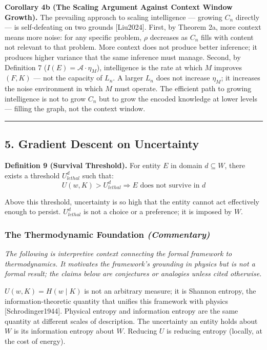 \documentclass[
]{article}
\begin{document}
\textbf{Corollary 4b (The Scaling Argument Against Context Window
Growth).} The prevailing approach to scaling intelligence --- growing
\(C_n\) directly --- is self-defeating on two grounds {[}Liu2024{]}.
First, by Theorem 2a, more context means more noise: for any specific
problem, \(\rho\) decreases as \(C_n\) fills with content not relevant
to that problem. More context does not produce better inference; it
produces higher variance that the same inference must manage. Second, by
Definition 7 (\(I(E) = \mathcal{A} \cdot
\eta_M\)), intelligence is the rate at which \(M\) improves \((F, K)\)
--- not the capacity of \(L_n\). A larger \(L_n\) does not increase
\(\eta_M\); it increases the noise environment in which \(M\) must
operate. The efficient path to growing intelligence is not to grow
\(C_n\) but to grow the encoded knowledge at lower levels --- filling
the graph, not the context window.

\begin{center}\rule{0.5\linewidth}{0.5pt}\end{center}

\subsection{5. Gradient Descent on
Uncertainty}\label{gradient-descent-on-uncertainty}

\textbf{Definition 9 (Survival Threshold).} For entity \(E\) in domain
\(d \subseteq W\), there exists a threshold \(U_{lethal}^d\) such that:
\[U(w, K) > U_{lethal}^d \Rightarrow E \text{ does not survive in } d\]

Above this threshold, uncertainty is so high that the entity cannot act
effectively enough to persist. \(U_{lethal}^d\) is not a choice or a
preference; it is imposed by \(W\).

\subsubsection{\texorpdfstring{The Thermodynamic Foundation
\emph{(Commentary)}}{The Thermodynamic Foundation (Commentary)}}\label{the-thermodynamic-foundation-commentary}

\emph{The following is interpretive context connecting the formal
framework to thermodynamics. It motivates the framework's grounding in
physics but is not a formal result; the claims below are conjectures or
analogies unless cited otherwise.}

\(U(w, K) = H(w \mid K)\) is not an arbitrary measure; it is Shannon
entropy, the information-theoretic quantity that unifies this framework
with physics {[}Schrodinger1944{]}. Physical entropy and information
entropy are the same quantity at different scales of description. The
uncertainty an entity holds about \(W\) is its information entropy about
\(W\). Reducing \(U\) is reducing entropy (locally, at the cost of
energy).
\end{document}
